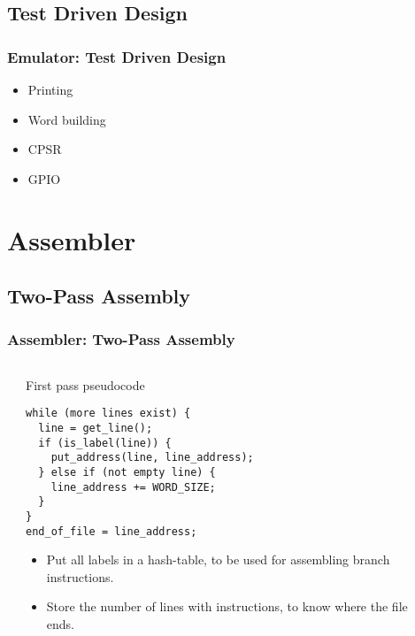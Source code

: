 \documentclass{beamer}
\begin{document}
\subsection{Test Driven Design}
\begin{frame}
\frametitle{Emulator: Test Driven Design}

\begin{itemize}
\item Printing
\item Word building
\item CPSR
\item GPIO
\end{itemize}
\end{frame}

\section{Assembler}

\subsection{Two-Pass Assembly}

\begin{frame}[fragile]
\frametitle{Assembler: Two-Pass Assembly}

\begin{columns}

\begin{column}{0.07\textwidth}
\end{column}

\begin{column}{0.80\textwidth}
\begin{block}{First pass pseudocode}
\begin{verbatim}
while (more lines exist) {
  line = get_line();
  if (is_label(line)) {
    put_address(line, line_address);
  } else if (not empty line) {
    line_address += WORD_SIZE;
  }
}
end_of_file = line_address;
\end{verbatim}
\end{block}

\begin{itemize}
\item Put all labels in a hash-table, to be used for assembling branch instructions.
\item Store the number of lines with instructions, to know where the file ends.
\end{itemize}
\end{column}

\begin{column}{0.07\textwidth}
\end{column}

\end{columns}
\end{frame}
\end{document}
